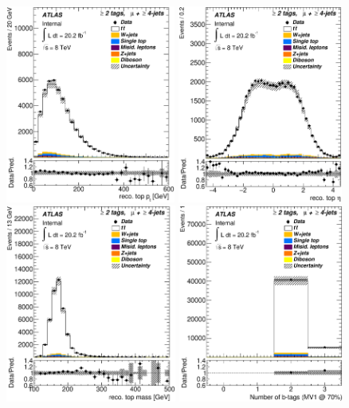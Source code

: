 \begin{figure}[!h]
\begin{center}
		\includegraphics[height=65mm]{chapters/whel/figures/control_Plots2/bTag_2incl/reco_Top_pt_mu}
		\includegraphics[height=65mm]{chapters/whel/figures/control_Plots2/bTag_2incl/reco_Top_eta_mu}\\
		\includegraphics[height=65mm]{chapters/whel/figures/control_Plots2/bTag_2incl/reco_Top_m_mu}
		\includegraphics[height=65mm]{chapters/whel/figures/control_Plots2/bTag_2incl/NumberBtags_mu}\\

\end{center}
\end{figure}
